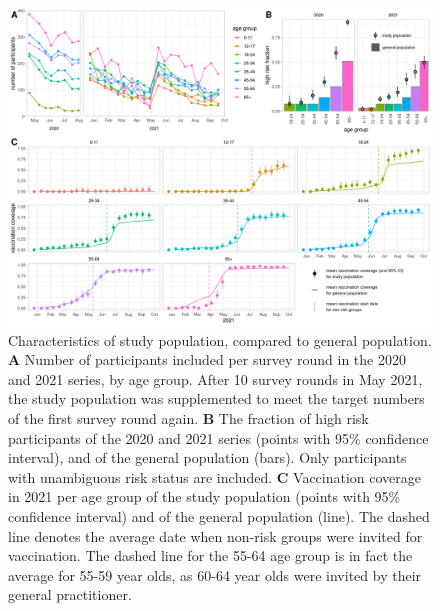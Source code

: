 \documentclass[fleqn,10pt]{wlscirep}
\begin{document}
\begin{figure}[ht]
\centering
\includegraphics[width=\linewidth]{../figures/characteristics_studypopulation.png}
\caption{Characteristics of study population, compared to general population. \textbf{A} Number of participants included per survey round in the 2020 and 2021 series, by age group. After 10 survey rounds in May 2021, the study population was supplemented to meet the target numbers of the first survey round again.  \textbf{B} The fraction of high risk participants of the 2020 and 2021 series (points with 95\% confidence interval), and of the general population \cite{Nivel_2021} (bars). Only participants with unambiguous risk status are included. \textbf{C} Vaccination coverage in 2021 per age group of the study population (points with 95\% confidence interval) and of the general population \cite{RIVM_2022} (line). The dashed line denotes the average date when non-risk groups were invited for vaccination. The dashed line for the 55-64 age group is in fact the average for 55-59 year olds, as 60-64 year olds were invited by their general practitioner. }
\label{fig:part}
\end{figure}

\clearpage
\end{document}
